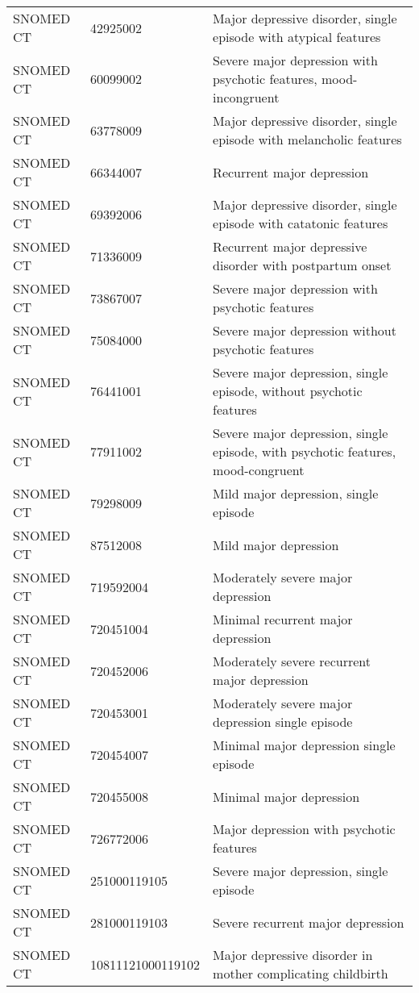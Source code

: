 \begin{longtable}{p{}p{}p{}}
  SNOMED CT & 42925002 & Major depressive disorder, single episode with atypical features \\ 
  SNOMED CT & 60099002 & Severe major depression with psychotic features, mood-incongruent \\ 
  SNOMED CT & 63778009 & Major depressive disorder, single episode with melancholic features \\ 
  SNOMED CT & 66344007 & Recurrent major depression \\ 
  SNOMED CT & 69392006 & Major depressive disorder, single episode with catatonic features \\ 
  SNOMED CT & 71336009 & Recurrent major depressive disorder with postpartum onset \\ 
  SNOMED CT & 73867007 & Severe major depression with psychotic features \\ 
  SNOMED CT & 75084000 & Severe major depression without psychotic features \\ 
  SNOMED CT & 76441001 & Severe major depression, single episode, without psychotic features \\ 
  SNOMED CT & 77911002 & Severe major depression, single episode, with psychotic features, mood-congruent \\ 
  SNOMED CT & 79298009 & Mild major depression, single episode \\ 
  SNOMED CT & 87512008 & Mild major depression \\ 
  SNOMED CT & 719592004 & Moderately severe major depression \\ 
  SNOMED CT & 720451004 & Minimal recurrent major depression \\ 
  SNOMED CT & 720452006 & Moderately severe recurrent major depression \\ 
  SNOMED CT & 720453001 & Moderately severe major depression single episode \\ 
  SNOMED CT & 720454007 & Minimal major depression single episode \\ 
  SNOMED CT & 720455008 & Minimal major depression \\ 
  SNOMED CT & 726772006 & Major depression with psychotic features \\ 
  SNOMED CT & 251000119105 & Severe major depression, single episode \\ 
  SNOMED CT & 281000119103 & Severe recurrent major depression \\ 
  SNOMED CT & 10811121000119102 & Major depressive disorder in mother complicating childbirth \\ 

\end{longtable}
